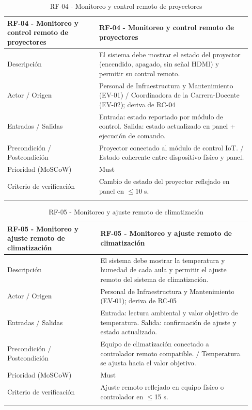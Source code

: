 \begingroup
\small
\begin{longtable}{|p{7.8cm}|p{7.8cm}|}
\hline
RF-04 - Monitoreo y control remoto de proyectores & RF-04 - Monitoreo y control remoto de proyectores \\ \hline
Descripción & El sistema debe mostrar el estado del proyector (encendido, apagado, sin señal HDMI) y permitir su control remoto. \\ \hline
Actor / Origen & Personal de Infraestructura y Mantenimiento (EV-01) / Coordinadora de la Carrera-Docente (EV-02); deriva de RC-04 \\ \hline
Entradas / Salidas & Entrada: estado reportado por módulo de control. Salida: estado actualizado en panel + ejecución de comando. \\ \hline
Precondición / Postcondición & Proyector conectado al módulo de control IoT. / Estado coherente entre dispositivo físico y panel. \\ \hline
Prioridad (MoSCoW) & Must \\ \hline
Criterio de verificación & Cambio de estado del proyector reflejado en panel en $\leq$10 s. \\ \hline
\caption{RF-04 - Monitoreo y control remoto de proyectores}
\end{longtable}
\endgroup

\begingroup
\small
\begin{longtable}{|p{7.8cm}|p{7.8cm}|}
\hline
RF-05 - Monitoreo y ajuste remoto de climatización & RF-05 - Monitoreo y ajuste remoto de climatización \\ \hline
Descripción & El sistema debe mostrar la temperatura y humedad de cada aula y permitir el ajuste remoto del sistema de climatización. \\ \hline
Actor / Origen & Personal de Infraestructura y Mantenimiento (EV-01); deriva de RC-05 \\ \hline
Entradas / Salidas & Entrada: lectura ambiental y valor objetivo de temperatura. Salida: confirmación de ajuste y estado actualizado. \\ \hline
Precondición / Postcondición & Equipo de climatización conectado a controlador remoto compatible. / Temperatura se ajusta hacia el valor objetivo. \\ \hline
Prioridad (MoSCoW) & Must \\ \hline
Criterio de verificación & Ajuste remoto reflejado en equipo físico o controlador en $\leq$15 s. \\ \hline
\caption{RF-05 - Monitoreo y ajuste remoto de climatización}
\end{longtable}
\endgroup

